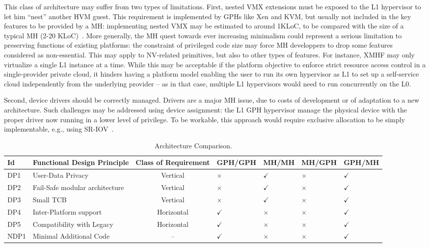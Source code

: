 \documentclass{sig-alternate}
\begin{document}
This class of architecture may suffer from two types of limitations. First, nested VMX extensions must be exposed to the L1 hypervisor to let him ``nest'' another HVM guest. This requirement is implemented by GPHs like Xen and KVM, but usually not included in the key features to be provided by a MH: implementing nested VMX may be estimated to around 1KLoC, to be compared with the size of a typical MH (2-20 KLoC)~\cite{xmhf}.
More generally, the MH quest towards ever increasing minimalism could represent a serious limitation to preserving functions of existing platforms: the constraint of privileged code size may force MH developpers to drop some features considered as non-essential. This may apply to NV-related primitives, but also to other types of features. For instance, XMHF may only virtualize a single L1 instance at a time. While this may be acceptable if the platform objective to enforce strict resource access control in a single-provider private cloud, it hinders having a platform model enabling the user to run its own hypervisor as L1 to set up a self-service cloud independently from the underlying provider -- as in that case, multiple L1 hypervisors would need to run concurrently on the L0.

Second, device drivers should be correctly managed. Drivers are a major MH issue, due to costs of development or of adaptation to a new architecture. Such challenges may be addressed using device assignment: the L1 GPH hypervisor manage the physical device with the proper driver now running in a lower level of privilege. To be workable, this approach would require exclusive allocation to be simply implementable, e.g., using SR-IOV~\cite{sriov}.

\begin{table}
\caption{Architecture Comparison.\label{fin:conf}}
\centering
\begin{tabular}{llcllll}
\toprule
Id & Functional Design Principle & Class of Requirement & GPH/GPH & MH/MH & MH/GPH & GPH/MH\\
\midrule
DP1  & User-Data Privacy               & Vertical   & $\times$      & $\checkmark$  & $\times$ & $\checkmark$ \\
DP2  & Fail-Safe modular architecture  & Vertical   & $\times$      & $\checkmark$  & $\times$ & $\checkmark$ \\
DP3  & Small TCB                       & Vertical   &  $\times$     & $\checkmark$  & $\times$ & $\checkmark$ \\
DP4  & Inter-Platform support          & Horizontal & $\checkmark$  & $\times$      & $\times$ & $\checkmark$ \\
DP5  & Compatibility with Legacy       & Horizontal & $\checkmark$  & $\times$      & $\times$ & $\checkmark$ \\
NDP1 & Minimal Additional Code         & --         & $\checkmark$  & $\times$      & $\times$ & $\checkmark$ \\
\bottomrule
\end{tabular}
\end{table}
 
\end{document}
